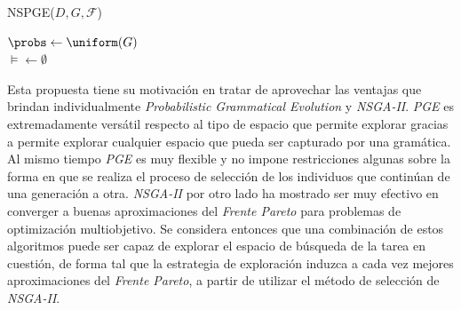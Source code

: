 \begin{algorithm}[!htb]
    \caption{NSPGE($D, G, \mathcal{F}$)\label{code:nspge}}

    \init $\probs \leftarrow \uniform(G)$ \\
    \init $\models \leftarrow \emptyset$ \\
    \Return{\models}
\end{algorithm}

Esta propuesta tiene su motivación en tratar de aprovechar las ventajas que brindan individualmente \emph{Probabilistic Grammatical Evolution} y \emph{NSGA-II}.
\emph{PGE} es extremadamente versátil respecto al tipo de espacio que permite explorar gracias a permite explorar cualquier espacio que pueda ser capturado por una gramática.
Al mismo tiempo \emph{PGE} es muy flexible y no impone restricciones algunas sobre la forma en que se realiza el proceso de selección de los individuos que continúan de una generación a otra.
\emph{NSGA-II} por otro lado ha mostrado ser muy efectivo en converger a buenas aproximaciones del \emph{Frente Pareto} para problemas de optimización multiobjetivo.
Se considera entonces que una combinación de estos algoritmos puede ser capaz de explorar el espacio de búsqueda de la tarea en cuestión, de forma tal que la estrategia de exploración induzca a cada vez mejores aproximaciones del \emph{Frente Pareto}, a partir de utilizar el método de selección de \emph{NSGA-II}.

